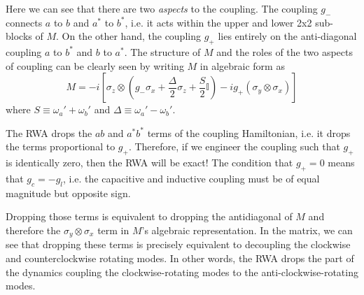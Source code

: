 Here we can see that there are two \emph{aspects} to the coupling.
The coupling $g_-$ connects $a$ to $b$ and $a^*$ to $b^*$, i.e. it acts within the upper and lower 2x2 sub-blocks of $M$.
On the other hand, the coupling $g_+$ lies entirely on the anti-diagonal coupling $a$ to $b^*$ and $b$ to $a^*$.
The structure of $M$ and the roles of the two aspects of coupling can be clearly seen by writing $M$ in algebraic form as
\begin{equation}
  M = -i \left[
    \sigma_z \otimes
      \left(
        g_- \sigma_x + \frac{\Delta}{2} \sigma_z + \frac{S}{2} \mathbb{I}
      \right)
    -i g_+ (\sigma_y \otimes \sigma_x)
  \right]
\end{equation}
where $S \equiv \omega_a' + \omega_b'$ and $\Delta \equiv \omega_a' - \omega_b'$.


The RWA drops the $ab$ and $a^* b^*$ terms of the coupling Hamiltonian, i.e. it drops the terms proportional to $g_+$.
Therefore, if we engineer the coupling such that $g_+$ is identically zero, then the RWA will be exact!
The condition that $g_+ = 0$ means that $g_c = -g_l$, i.e. the capacitive and inductive coupling must be of equal magnitude but opposite sign.

Dropping those terms is equivalent to dropping the antidiagonal of $M$ and therefore the $\sigma_y \otimes \sigma_x$ term in $M$'s algebraic representation.
In the matrix, we can see that dropping these terms is precisely equivalent to decoupling the clockwise and counterclockwise rotating modes.
In other words, the RWA drops the part of the dynamics coupling the clockwise-rotating modes to the anti-clockwise-rotating modes.



